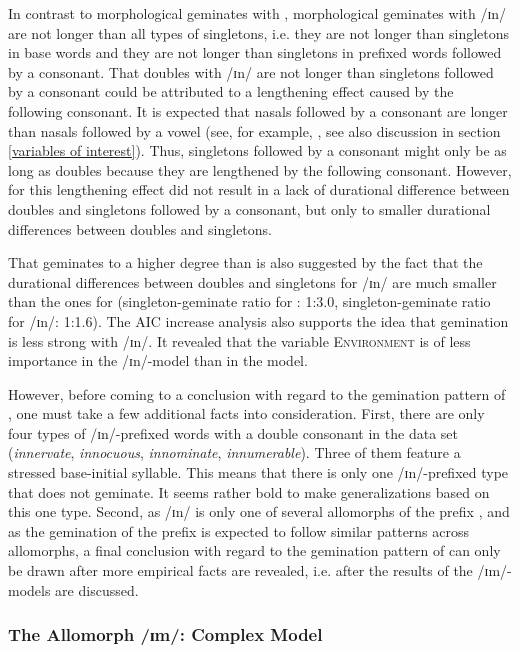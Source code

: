 In contrast to morphological geminates with , 
morphological geminates with /ɪn/ are not longer than all types of singletons, i.e. they are not longer than singletons in base words and they are not longer than singletons in prefixed words followed by a consonant. 
That doubles with /ɪn/ are not longer than singletons followed by a consonant could be attributed to a lengthening effect caused by the following consonant.
It is expected that nasals followed by a consonant are longer than nasals followed by a vowel (see, for example, \citealt{Umeda.1977}, see also discussion in section \ref{variables of interest}).  Thus, singletons followed by a consonant might only be as long as doubles because they are lengthened by the following consonant. However, for  this lengthening effect did not result in a lack of durational difference between doubles and singletons followed by a consonant, but only to smaller durational differences between doubles and singletons.  

That  geminates to a higher degree than  is also suggested by the fact that the durational differences between doubles and singletons for /ɪn/ are much smaller than the ones for  (singleton-geminate ratio for : 1:3.0, singleton-geminate ratio for /ɪn/: 1:1.6). 
The AIC increase analysis also supports the idea that gemination is less strong with /ɪn/. It revealed that the variable \textsc{Environment} is of less importance in the /ɪn/-model than in the model.




However, before coming to a conclusion with regard to the gemination pattern of , one must take a few additional facts into consideration. 
First, there are only four types of /ɪn/-prefixed words with a double consonant in the data set (\textit{innervate}, \textit{innocuous}, \textit{innominate}, \textit{innumerable}). Three of them feature a stressed base-initial syllable. This means that there is only one /ɪn/-prefixed type that does not geminate. It seems rather bold to make generalizations based on this one type. 
Second, as /ɪn/ is only one of several allomorphs of the prefix , and as the gemination of the prefix  is expected to follow similar patterns across allomorphs, 
a final conclusion with regard to the gemination pattern of  can only be drawn after more empirical facts are revealed, i.e. after the results of the /ɪm/-models are discussed.
%


\subsubsection{The Allomorph /ɪm/: Complex Model}


